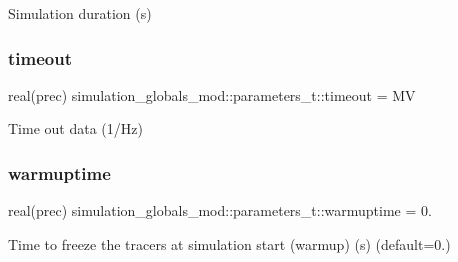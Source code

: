 Simulation duration (s) 

\mbox{\label{group___k_e_y_w_o_r_d_s_gaf4190961e6191cf07a9b04b0b864ec95}} 
\subsubsection{\texorpdfstring{timeout}{timeout}}
{\footnotesize\ttfamily real(prec) simulation\+\_\+globals\+\_\+mod\+::parameters\+\_\+t\+::timeout = MV\hspace{0.3cm}{\ttfamily [private]}}



Time out data (1/\+Hz) 

\mbox{\label{group___k_e_y_w_o_r_d_s_gaed7511e2225ac602d053476e4688d49a}} 
\subsubsection{\texorpdfstring{warmuptime}{warmuptime}}
{\footnotesize\ttfamily real(prec) simulation\+\_\+globals\+\_\+mod\+::parameters\+\_\+t\+::warmuptime = 0.\hspace{0.3cm}{\ttfamily [private]}}



Time to freeze the tracers at simulation start (warmup) (s) (default=0.) 

